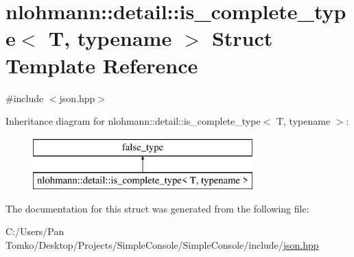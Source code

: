 \hypertarget{structnlohmann_1_1detail_1_1is__complete__type}{}\section{nlohmann\+::detail\+::is\+\_\+complete\+\_\+type$<$ T, typename $>$ Struct Template Reference}
\label{structnlohmann_1_1detail_1_1is__complete__type}


{\ttfamily \#include $<$json.\+hpp$>$}

Inheritance diagram for nlohmann\+::detail\+::is\+\_\+complete\+\_\+type$<$ T, typename $>$\+:\begin{figure}[H]
\begin{center}
\leavevmode
\includegraphics[height=2.000000cm]{d2/db3/structnlohmann_1_1detail_1_1is__complete__type}
\end{center}
\end{figure}


The documentation for this struct was generated from the following file\+:\begin{DoxyCompactItemize}
\item 
C\+:/\+Users/\+Pan Tomko/\+Desktop/\+Projects/\+Simple\+Console/\+Simple\+Console/include/\mbox{\hyperlink{json_8hpp}{json.\+hpp}}\end{DoxyCompactItemize}
